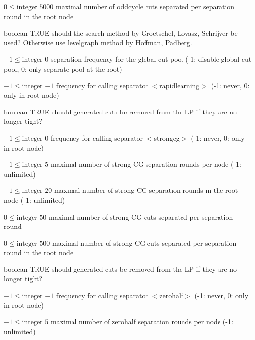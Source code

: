 %
{$0\leq\textrm{integer}$}%
{$5000$}%
{maximal number of oddcycle cuts separated per separation round in the root node}%
{}

%
{boolean}%
{TRUE}%
{should the search method by Groetschel, Lovasz, Schrijver be used? Otherwise use levelgraph method by Hoffman, Padberg.}%
{}

%
{$-1\leq\textrm{integer}$}%
{$0$}%
{separation frequency for the global cut pool (-1: disable global cut pool, 0: only separate pool at the root)}%
{}

%
{$-1\leq\textrm{integer}$}%
{$-1$}%
{frequency for calling separator $<$rapidlearning$>$ (-1: never, 0: only in root node)}%
{}

%
{boolean}%
{TRUE}%
{should generated cuts be removed from the LP if they are no longer tight?}%
{}

%
{$-1\leq\textrm{integer}$}%
{$0$}%
{frequency for calling separator $<$strongcg$>$ (-1: never, 0: only in root node)}%
{}

%
{$-1\leq\textrm{integer}$}%
{$5$}%
{maximal number of strong CG separation rounds per node (-1: unlimited)}%
{}

%
{$-1\leq\textrm{integer}$}%
{$20$}%
{maximal number of strong CG separation rounds in the root node (-1: unlimited)}%
{}

%
{$0\leq\textrm{integer}$}%
{$50$}%
{maximal number of strong CG cuts separated per separation round}%
{}

%
{$0\leq\textrm{integer}$}%
{$500$}%
{maximal number of strong CG cuts separated per separation round in the root node}%
{}

%
{boolean}%
{TRUE}%
{should generated cuts be removed from the LP if they are no longer tight?}%
{}

%
{$-1\leq\textrm{integer}$}%
{$-1$}%
{frequency for calling separator $<$zerohalf$>$ (-1: never, 0: only in root node)}%
{}

%
{$-1\leq\textrm{integer}$}%
{$5$}%
{maximal number of zerohalf separation rounds per node (-1: unlimited)}%
{}

